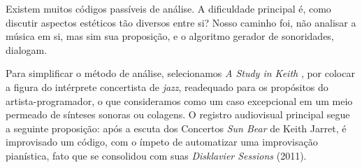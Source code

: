 Existem muitos códigos passíveis de análise. A dificuldade principal é, como discutir aspectos estéticos tão diversos entre si? Nosso caminho foi, não analisar a música em si, mas sim sua proposição, e o algoritmo gerador de sonoridades, dialogam.  

Para simplificar o método de análise, selecionamos \emph{A Study in Keith} \cite{sorensen_keith_2009,sorensen_youtube_2014}, por colocar a figura do intérprete concertista de \emph{jazz}, readequado para os propósitos do artista-programador, o que consideramos como um caso excepcional em um meio permeado de sínteses sonoras ou colagens. O registro audiovisual principal segue a seguinte proposição: após a escuta dos Concertos \emph{Sun Bear} de Keith Jarret, é improvisado um código, com o ímpeto de automatizar uma improvisação pianística, fato que se consolidou com suas \emph{Disklavier Sessions} (2011).

